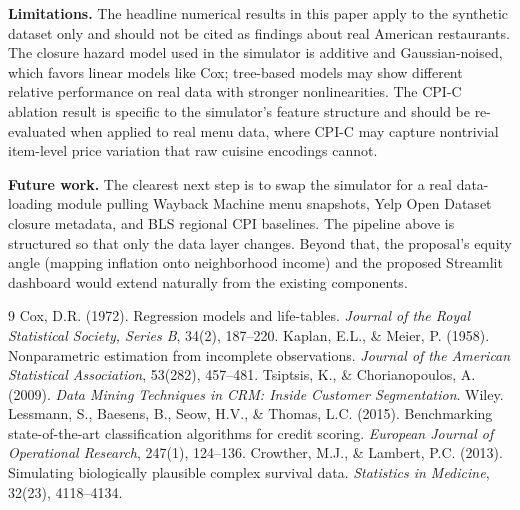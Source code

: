 \documentclass{article}
\begin{document}
\textbf{Limitations.} The headline numerical results in this paper apply to the synthetic dataset only and should not be cited as findings about real American restaurants. The closure hazard model used in the simulator is additive and Gaussian-noised, which favors linear models like Cox; tree-based models may show different relative performance on real data with stronger nonlinearities. The CPI-C ablation result is specific to the simulator's feature structure and should be re-evaluated when applied to real menu data, where CPI-C may capture nontrivial item-level price variation that raw cuisine encodings cannot.

\textbf{Future work.} The clearest next step is to swap the simulator for a real data-loading module pulling Wayback Machine menu snapshots, Yelp Open Dataset closure metadata, and BLS regional CPI baselines. The pipeline above is structured so that only the data layer changes. Beyond that, the proposal's equity angle (mapping inflation onto neighborhood income) and the proposed Streamlit dashboard would extend naturally from the existing components.

\begin{thebibliography}{9}
 Cox, D.R. (1972). Regression models and life-tables. \emph{Journal of the Royal Statistical Society, Series B}, 34(2), 187--220.
 Kaplan, E.L., \& Meier, P. (1958). Nonparametric estimation from incomplete observations. \emph{Journal of the American Statistical Association}, 53(282), 457--481.
 Tsiptsis, K., \& Chorianopoulos, A. (2009). \emph{Data Mining Techniques in CRM: Inside Customer Segmentation}. Wiley.
 Lessmann, S., Baesens, B., Seow, H.V., \& Thomas, L.C. (2015). Benchmarking state-of-the-art classification algorithms for credit scoring. \emph{European Journal of Operational Research}, 247(1), 124--136.
 Crowther, M.J., \& Lambert, P.C. (2013). Simulating biologically plausible complex survival data. \emph{Statistics in Medicine}, 32(23), 4118--4134.
\end{thebibliography}
\end{document}
